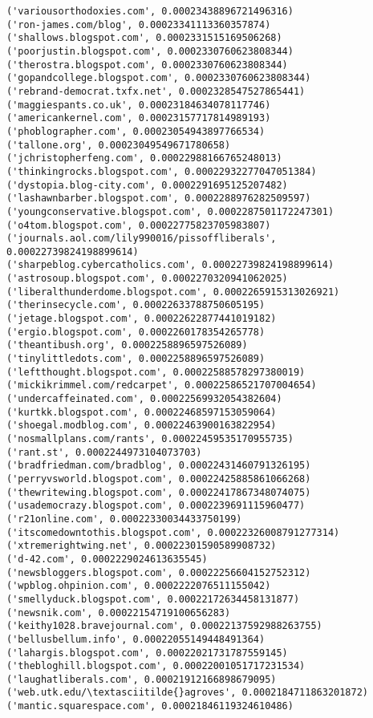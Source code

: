 \documentclass[11pt]{article}
\begin{document}
\begin{Verbatim}[commandchars=\\\{\}]
('variousorthodoxies.com', 0.00023438896721496316)
('ron-james.com/blog', 0.00023341113360357874)
('shallows.blogspot.com', 0.0002331515169506268)
('poorjustin.blogspot.com', 0.0002330760623808344)
('therostra.blogspot.com', 0.0002330760623808344)
('gopandcollege.blogspot.com', 0.0002330760623808344)
('rebrand-democrat.txfx.net', 0.0002328547527865441)
('maggiespants.co.uk', 0.00023184634078117746)
('americankernel.com', 0.00023157717814989193)
('phoblographer.com', 0.00023054943897766534)
('tallone.org', 0.00023049549671780658)
('jchristopherfeng.com', 0.00022988166765248013)
('thinkingrocks.blogspot.com', 0.00022932277047051384)
('dystopia.blog-city.com', 0.0002291695125207482)
('lashawnbarber.blogspot.com', 0.0002288976282509597)
('youngconservative.blogspot.com', 0.0002287501172247301)
('o4tom.blogspot.com', 0.00022775823705983807)
('journals.aol.com/lily990016/pissoffliberals', 0.00022739824198899614)
('sharpeblog.cybercatholics.com', 0.00022739824198899614)
('astrosoup.blogspot.com', 0.0002270320941062025)
('liberalthunderdome.blogspot.com', 0.0002265915313026921)
('therinsecycle.com', 0.00022633788750605195)
('jetage.blogspot.com', 0.00022622877441019182)
('ergio.blogspot.com', 0.0002260178354265778)
('theantibush.org', 0.0002258896597526089)
('tinylittledots.com', 0.0002258896597526089)
('leftthought.blogspot.com', 0.00022588578297380019)
('mickikrimmel.com/redcarpet', 0.00022586521707004654)
('undercaffeinated.com', 0.00022569932054382604)
('kurtkk.blogspot.com', 0.00022468597153059064)
('shoegal.modblog.com', 0.00022463900163822954)
('nosmallplans.com/rants', 0.00022459535170955735)
('rant.st', 0.0002244973104073703)
('bradfriedman.com/bradblog', 0.00022431460791326195)
('perryvsworld.blogspot.com', 0.00022425885861066268)
('thewritewing.blogspot.com', 0.00022417867348074075)
('usademocrazy.blogspot.com', 0.0002239691115960477)
('r21online.com', 0.00022330034433750199)
('itscomedowntothis.blogspot.com', 0.00022326008791277314)
('xtremerightwing.net', 0.00022301590589908732)
('d-42.com', 0.0002229024613635545)
('newsbloggers.blogspot.com', 0.00022256604152752312)
('wpblog.ohpinion.com', 0.0002222076511155042)
('smellyduck.blogspot.com', 0.00022172634458131877)
('newsnik.com', 0.00022154719100656283)
('keithy1028.bravejournal.com', 0.00022137592988263755)
('bellusbellum.info', 0.00022055149448491364)
('lahargis.blogspot.com', 0.00022021731787559145)
('thebloghill.blogspot.com', 0.00022001051717231534)
('laughatliberals.com', 0.00021912166898679095)
('web.utk.edu/\textasciitilde{}agroves', 0.0002184711863201872)
('mantic.squarespace.com', 0.00021846119324610486)

\end{Verbatim}
\end{document}

